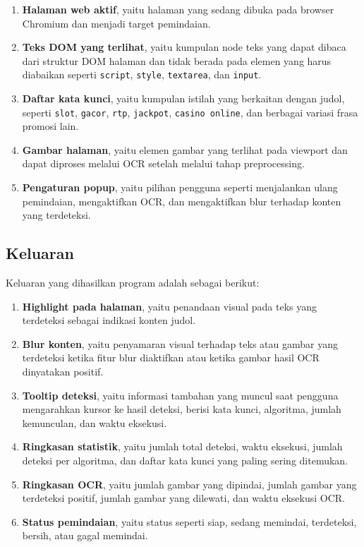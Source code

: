 \begin{enumerate}
    \item \textbf{Halaman web aktif}, yaitu halaman yang sedang dibuka pada
    browser Chromium dan menjadi target pemindaian.

    \item \textbf{Teks DOM yang terlihat}, yaitu kumpulan node teks yang dapat
    dibaca dari struktur DOM halaman dan tidak berada pada elemen yang harus
    diabaikan seperti \texttt{script}, \texttt{style}, \texttt{textarea}, dan
    \texttt{input}.

    \item \textbf{Daftar kata kunci}, yaitu kumpulan istilah yang berkaitan
    dengan judol, seperti \texttt{slot}, \texttt{gacor}, \texttt{rtp},
    \texttt{jackpot}, \texttt{casino online}, dan berbagai variasi frasa
    promosi lain.

    \item \textbf{Gambar halaman}, yaitu elemen gambar yang terlihat pada
    viewport dan dapat diproses melalui OCR setelah melalui tahap preprocessing.

    \item \textbf{Pengaturan popup}, yaitu pilihan pengguna seperti menjalankan
    ulang pemindaian, mengaktifkan OCR, dan mengaktifkan blur terhadap konten
    yang terdeteksi.
\end{enumerate}

\subsection{Keluaran}

Keluaran yang dihasilkan program adalah sebagai berikut:

\begin{enumerate}
    \item \textbf{Highlight pada halaman}, yaitu penandaan visual pada teks
    yang terdeteksi sebagai indikasi konten judol.

    \item \textbf{Blur konten}, yaitu penyamaran visual terhadap teks atau
    gambar yang terdeteksi ketika fitur blur diaktifkan atau ketika gambar
    hasil OCR dinyatakan positif.

    \item \textbf{Tooltip deteksi}, yaitu informasi tambahan yang muncul saat
    pengguna mengarahkan kursor ke hasil deteksi, berisi kata kunci,
    algoritma, jumlah kemunculan, dan waktu eksekusi.

    \item \textbf{Ringkasan statistik}, yaitu jumlah total deteksi, waktu
    eksekusi, jumlah deteksi per algoritma, dan daftar kata kunci yang paling
    sering ditemukan.

    \item \textbf{Ringkasan OCR}, yaitu jumlah gambar yang dipindai, jumlah
    gambar yang terdeteksi positif, jumlah gambar yang dilewati, dan waktu
    eksekusi OCR.

    \item \textbf{Status pemindaian}, yaitu status seperti siap, sedang
    memindai, terdeteksi, bersih, atau gagal memindai.
\end{enumerate}
